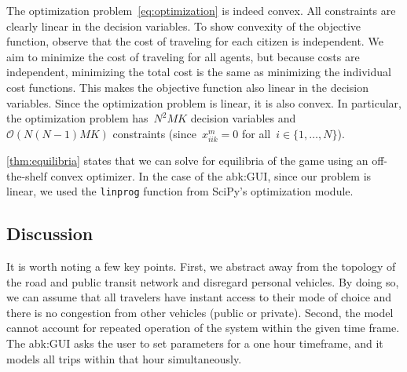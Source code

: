 \begin{remark}
    The optimization problem~\eqref{eq:optimization} is indeed convex. 
    All constraints are clearly linear in the decision variables. 
    To show convexity of the objective function, observe that the cost of traveling for each citizen is independent. We aim to minimize the cost of traveling for all agents, but because costs are independent, minimizing the total cost is the same as minimizing the individual cost functions. This makes the objective function also linear in the decision variables. Since the optimization problem is linear, it is also convex. 
    In particular, the optimization problem has~$N^2MK$ decision variables and~$\mathcal{O}(N(N-1)MK)$ constraints (since~$x_{iik}^m=0$ for all~$i\in\{1,\ldots,N\}$).
\end{remark}

\cref{thm:equilibria} states that we can solve for equilibria of the game using an off-the-shelf convex optimizer. In the case of the \gls{abk:GUI}, since our problem is linear, we used the \texttt{linprog} function from SciPy's optimization module.


\subsection{Discussion}
It is worth noting a few key points. First, we abstract away from the topology of the road and public transit network and disregard personal vehicles. By doing so, we can assume that all travelers have instant access to their mode of choice and there is no congestion from other vehicles (public or private). Second, the model cannot account for repeated operation of the system within the given time frame. The \gls{abk:GUI} asks the user to set parameters for a one hour timeframe, and it models all trips within that hour simultaneously. 